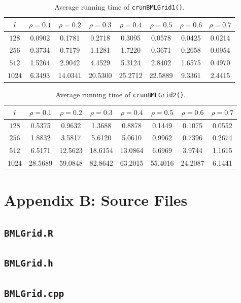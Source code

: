 \documentclass{article}
\begin{document}
\begin{table}[H]
    \renewcommand{\arraystretch}{1.3}
    \caption{Average running time of \texttt{crunBMLGrid1()}.}
    \label{tab:time_crunBMLGrid1}
    \centering
    \begin{tabular}{c|ccccccc}
        \hline
          $l$ & $\rho = 0.1$ & $\rho = 0.2$& $\rho = 0.3$ &$\rho = 0.4$ & $\rho
          = 0.5$ & $\rho = 0.6$ & $\rho = 0.7$ \\
        \hline
        $128$ & 0.0902 & 0.1781 & 0.2718 & 0.3095 & 0.0578 & 0.0425 & 0.0214 \\
        $256$ & 0.3734 & 0.7179 & 1.1281 & 1.7220 & 0.3671 & 0.2658 & 0.0954 \\
        $512$ & 1.5264 & 2.9042 & 4.4529 & 5.3124 & 2.8402 & 1.6575 & 0.4970 \\
        $1024$ & 6.3493 & 14.0341 & 20.5300 & 25.2712 & 22.5889 & 9.3361 &
        2.4415 \\
        \hline
    \end{tabular}
\end{table}

\begin{table}[H]
    \renewcommand{\arraystretch}{1.3}
    \caption{Average running time of \texttt{crunBMLGrid2()}.}
    \label{tab:time_crunBMLGrid2}
    \centering
    \begin{tabular}{c|ccccccc}
        \hline
          $l$ & $\rho = 0.1$ & $\rho = 0.2$& $\rho = 0.3$ &$\rho = 0.4$ & $\rho
          = 0.5$ & $\rho = 0.6$ & $\rho = 0.7$ \\
        \hline
        $128$ & 0.5375 & 0.9632 & 1.3688 & 0.8878 & 0.1449 & 0.1075 & 0.0552 \\
        $256$ & 1.8832 & 3.5817 & 5.6120 & 5.0610 & 0.9962 & 0.7396 & 0.2674 \\
        $512$ & 6.5171 & 12.5623 & 18.6154 & 13.0864 & 6.6969 & 3.9744 &
        1.1615\\
        $1024$ & 28.5689 & 59.0848 & 82.8642 & 63.2015 & 55.4016 & 24.2087 &
        6.1441\\
        \hline
    \end{tabular}
\end{table}

\pagebreak
\section*{Appendix B: Source Files}
\subsection*{\texttt{BMLGrid.R}}

\subsection*{\texttt{BMLGrid.h}}

\subsection*{\texttt{BMLGrid.cpp}}



\end{document}
